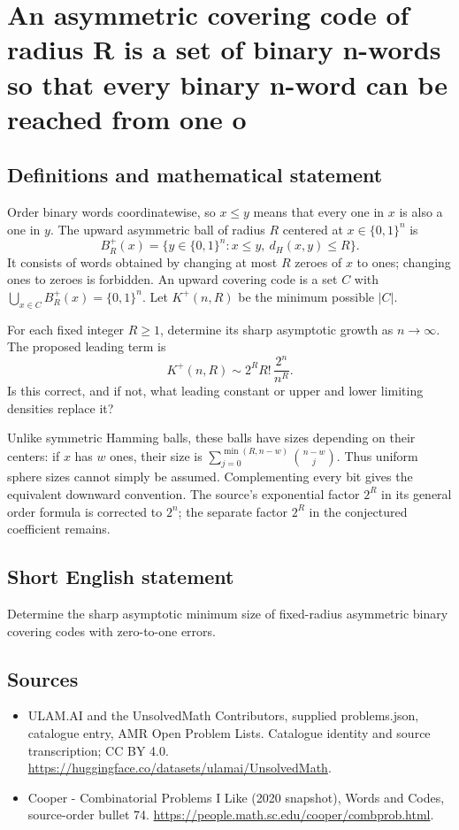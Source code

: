 \documentclass[11pt,a4paper]{article}
\begin{document}
\section*{An asymmetric covering code of radius R is a set of binary n-words so that every binary n-word can be reached from one o}\label{statement}

\subsection{Definitions and mathematical statement}
Order binary words coordinatewise, so $x\le y$ means that every
one in $x$ is also a one in $y$. The upward asymmetric ball of
radius $R$ centered at $x\in\{0,1\}^n$ is
\[
 B_R^+(x)=\{y\in\{0,1\}^n:x\le y,\ d_H(x,y)\le R\}.
\]
It consists of words obtained by changing at most $R$ zeroes
of $x$ to ones; changing ones to zeroes is forbidden.
An upward covering code is a set $C$ with
$\bigcup_{x\in C}B_R^+(x)=\{0,1\}^n$. Let $K^+(n,R)$ be the
minimum possible $|C|$.

For each fixed integer $R\ge1$, determine its sharp asymptotic
growth as $n\to\infty$. The proposed leading term is
\[
                K^+(n,R)\sim 2^R R!\,\frac{2^n}{n^R}.
\]
Is this correct, and if not, what leading constant or upper and
lower limiting densities replace it?

Unlike symmetric Hamming balls, these balls have sizes depending
on their centers: if $x$ has $w$ ones, their size is
$\sum_{j=0}^{\min(R,n-w)}\binom{n-w}{j}$. Thus uniform sphere
sizes cannot simply be assumed. Complementing every bit gives
the equivalent downward convention. The source's exponential
factor $2^R$ in its general order formula is corrected to $2^n$;
the separate factor $2^R$ in the conjectured coefficient remains.
\subsection{Short English statement}
Determine the sharp asymptotic minimum size of fixed-radius asymmetric binary covering codes with zero-to-one errors.
\subsection{Sources}
\begin{itemize}
\item[S1] ULAM.AI and the UnsolvedMath Contributors, supplied problems.json, catalogue entry, AMR Open Problem Lists. Catalogue identity and source transcription; CC BY 4.0.
\url{https://huggingface.co/datasets/ulamai/UnsolvedMath}.
\item[S2] Cooper - Combinatorial Problems I Like (2020 snapshot), Words and Codes, source-order bullet 74. 
\url{https://people.math.sc.edu/cooper/combprob.html}.
\end{itemize}
\end{document}
